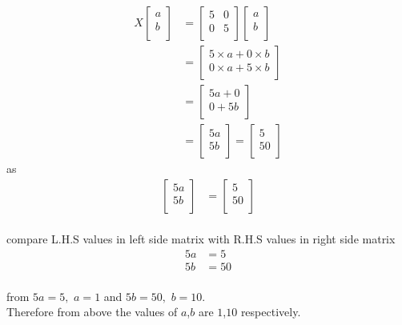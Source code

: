 \documentclass{article}
\begin{document}
    \begin{align}
  X\begin{bmatrix}
  a\\
  b\\
  \end{bmatrix} & = \begin{bmatrix}
  5 & 0\\
  0 & 5\\
  \end{bmatrix}
 \begin{bmatrix}
 a\\
 b\\
 \end{bmatrix}
 \nonumber\\
                            & = \begin{bmatrix}
                            5 \times a + 0 \times b\\
                            0 \times a + 5 \times b\\
                            \end{bmatrix}
                            \nonumber\\
                            & = \begin{bmatrix}
                            5a+0\\
                            0+5b\\
                            \end{bmatrix}
                            \nonumber\\
                            & = \begin{bmatrix}
                            5a\\
                            5b\\
                            \end{bmatrix} = \begin{bmatrix}
                            5\\
                            50\\
                            \end{bmatrix}
                            \end{align}as \begin{align}
                            \begin{bmatrix}
        5a\\
        5b\\
        \end{bmatrix} & = \begin{bmatrix}
        5\\
        50\\
        \end{bmatrix}
        \nonumber
        \end{align}\\
        
       compare L.H.S values in left side matrix with R.H.S values in right side matrix
\begin{align}
5a & = 5\nonumber\\
5b & = 50\nonumber
\end{align}\\
from $5a=5,$ $a = 1$ and $5b=50,$ $b=10.$\\
Therefore from above the values of $a$,$b$ are $1$,$10$ respectively.
   
\end{document}
